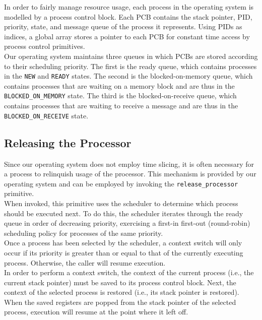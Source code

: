 \documentclass[12pt]{report}
\begin{document}
In order to fairly manage resource usage, each process in the operating system is modelled by a process control block. Each PCB contains the stack pointer, PID, priority, state, and message queue of the process it represents. Using PIDs as indices, a global array stores a pointer to each PCB for constant time access by process control primitives.\\

Our operating system maintains three queues in which PCBs are stored according to their scheduling priority. The first is the ready queue, which contains processes in the \texttt{NEW} and \texttt{READY} states. The second is the blocked-on-memory queue, which contains processes that are waiting on a memory block and are thus in the \texttt{BLOCKED_ON_MEMORY} state. The third is the blocked-on-receive queue, which contains processes that are waiting to receive a message and are thus in the \texttt{BLOCKED_ON_RECEIVE} state.

\subsection{Releasing the Processor}

Since our operating system does not employ time slicing, it is often necessary for a process to relinquish usage of the processor. This mechanism is provided by our operating system and can be employed by invoking the \texttt{release_processor} primitive.\\

When invoked, this primitive uses the scheduler to determine which process should be executed next. To do this, the scheduler iterates through the ready queue in order of decreasing priority, exercising a first-in first-out (round-robin) scheduling policy for processes of the same priority.\\

Once a process has been selected by the scheduler, a context switch will only occur if its priority is greater than or equal to that of the currently executing process. Otherwise, the caller will resume execution.\\

In order to perform a context switch, the context of the current process (i.e., the current stack pointer) must be saved to its process control block. Next, the context of the selected process is restored (i.e., its stack pointer is restored). When the saved registers are popped from the stack pointer of the selected process, execution will resume at the point where it left off.
\end{document}
